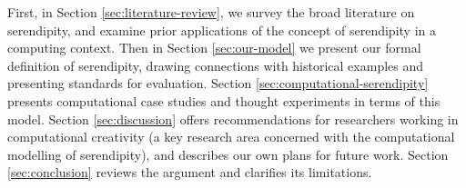 First, in
Section \ref{sec:literature-review}, we survey the broad literature on
serendipity, and examine prior applications of the concept of serendipity in a computing context.  Then in Section \ref{sec:our-model} we present our formal
definition of serendipity, drawing connections with historical examples 
and presenting standards for evaluation.  Section
\ref{sec:computational-serendipity} presents computational case studies and
thought experiments in terms of this model.  Section
\ref{sec:discussion} offers recommendations for researchers working in
computational creativity (a key research area concerned with the computational modelling of serendipity), and describes our own plans for future
work.  Section \ref{sec:conclusion} reviews the argument and
clarifies its limitations.


